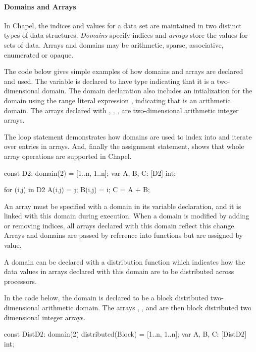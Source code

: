 \paragraph{Domains and Arrays}
In Chapel, the indices and values for a data set are maintained
in two distinct types of data structures.  \emph{Domains} specify indices
and \emph{arrays} store the values for sets of data.  Arrays and domains may
be arithmetic, sparse, associative, enumerated or opaque.

\begin{example}
The code below gives simple examples of how domains and arrays are declared
and used.
The variable  is declared to have type 
indicating that it is a two-dimensional domain.  The domain declaration
also includes an intialization for the domain using the range literal
expression ,
indicating that  is an arithmetic domain.  The arrays declared
with , , ,  are two-dimensional
arithmetic integer arrays.  

The  loop statement demonstrates
how domains are used to index into and iterate over entries in arrays.
And, finally the assignment statement,  shows that
whole array operations are supported in Chapel.

\begin{chapel}
const D2: domain(2) = [1..n, 1..n];
var A, B, C: [D2] int;

for (i,j) in D2 {
  A(i,j) = j;
  B(i,j) = i;
}
C = A + B;
\end{chapel}
\end{example}

An array must be specified with a domain in its variable declaration, and 
it is linked with this domain during execution.
When a domain is modified by adding or removing indices, all arrays 
declared with this domain reflect this change.  
Arrays and domains are passed by reference into functions but are
assigned by value.  

A domain can be declared with a distribution function which indicates how the 
data values in arrays declared with this domain are to be distributed across
processors.

\begin{example}
In the code below, the domain  is declared to be a 
block distributed two-dimensional arithmetic domain.
The arrays , , and  are then block distributed
two dimensional integer arrays.
\begin{chapel}
const DistD2: domain(2) distributed(Block) = [1..n, 1..n];
var A, B, C: [DistD2] int;
\end{chapel}
\end{example}

